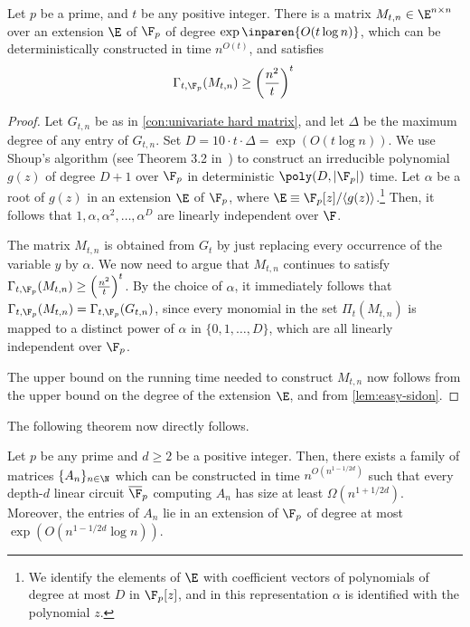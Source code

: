 \begin{lemma}
\label{lem:hard-over-finite}
Let $p$ be a prime, and $t $ be any positive integer. There is a matrix $M_{t,n} \in \E^{n\times n}$ over an extension $\E$ of $\F_p$ of degree $\exp\inparen{{O(t\log n)}}$, which can be deterministically constructed in time $n^{O(t)}$, and satisfies
\[
\Gamma_{t, \F_p}(M_{t,n}) \geq \left(\frac{n^2}{t}\right)^t\, 
\] 
\end{lemma}
\begin{proof}
Let $G_{t,n}$ be as in \autoref{con:univariate hard matrix}, and let $\Delta$ be the maximum degree of any entry of $G_{t,n}$. Set $D = 10\cdot t\cdot \Delta = \exp\left(O(t\log n)\right)$. We use Shoup's algorithm (see Theorem 3.2 in~\cite{Shoup90}) to construct an irreducible polynomial $g(z)$ of degree $D+1$ over $\F_p$ in deterministic  $\poly(D, |\F_p|)$ time. Let $\alpha$ be a root of $g(z)$ in an extension $\E$ of $\F_p$, where $\E \equiv \F_p[z]/\langle g(z) \rangle$.\footnote{We identify the elements of $\E$ with coefficient vectors of polynomials of degree at most $D$ in $\F_p[z]$, and in this representation $\alpha$ is identified with the polynomial $z$.} Then, it follows that $1, \alpha, \alpha^2, \ldots, \alpha^{D}$ are linearly independent over $\F$.

The matrix $M_{t,n}$ is obtained from $G_t$ by just replacing every occurrence of the variable $y$ by $\alpha$. We now need to argue that $M_{t,n}$ continues to satisfy $\Gamma_{t, \F_p}(M_{t,n}) \geq \left(\frac{n^2}{t}\right)^t$. By the choice of $\alpha$, it immediately follows that $\Gamma_{t, \F_p}(M_{t,n}) = \Gamma_{t, \F_p}(G_{t,n})$, since every monomial in the set $\Pi_t(M_{t,n})$ is mapped to a distinct power of $\alpha$ in $\{0, 1, \ldots, D\}$, which are all linearly independent over $\F_p$.

The upper bound on the running time needed to construct $M_{t,n}$ now follows from the upper bound on the degree of the extension $\E$, and from \autoref{lem:easy-sidon}.
\end{proof}
The following theorem now directly follows.
\begin{theorem}\label{thm:depth-d-finite}
Let $p$ be any prime and $d\geq 2$ be a positive integer. Then, there exists a family of matrices $\{A_n\}_{n \in \N}$ which can be constructed in time $n^{O(n^{1-1/2d})}$ such that every depth-$d$ linear circuit $\overline{\F}_p$ computing $A_n$ has size at least $\Omega(n^{1 + 1/2d})$. Moreover, the entries of $A_n$ lie in an extension of $\F_p$ of degree at most $\exp(O(n^{1-1/2d}\log n))$. 
\end{theorem}
